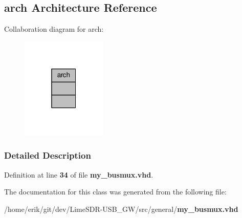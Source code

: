 \subsection{arch Architecture Reference}
\label{classmy__busmux_1_1arch}


Collaboration diagram for arch\+:\nopagebreak
\begin{figure}[H]
\begin{center}
\leavevmode
\includegraphics[width=115pt]{dc/dc1/classmy__busmux_1_1arch__coll__graph}
\end{center}
\end{figure}


\subsubsection{Detailed Description}


Definition at line {\bf 34} of file {\bf my\+\_\+busmux.\+vhd}.



The documentation for this class was generated from the following file\+:\begin{DoxyCompactItemize}
\item 
/home/erik/git/dev/\+Lime\+S\+D\+R-\/\+U\+S\+B\+\_\+\+G\+W/src/general/{\bf my\+\_\+busmux.\+vhd}\end{DoxyCompactItemize}
